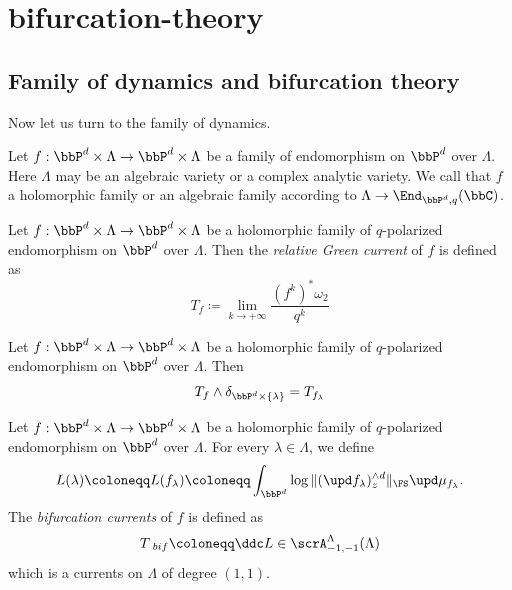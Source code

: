 \section{bifurcation-theory}

\subsection[status=draft,tag=0000000,label=\labelNFM{subsec:family-of-dynamics-and-bifurcation-theorey}]{Family of dynamics and bifurcation theory}

Now let us turn to the family of dynamics.

Let $f: \bbP^d \times \Lambda \to \bbP^d \times \Lambda$ be a family of endomorphism on $\bbP^d$ over $\Lambda$.
Here $\Lambda$ may be an algebraic variety or a complex analytic variety.
We call that $f$ a holomorphic family or an algebraic family according to $\Lambda \to \End_{\bbP^d,q}(\bbC)$.

\begin{definition}[label=\labelNFM{def:relative-green-currents}, status=draft, tag=0000000]
	Let $f: \bbP^d \times \Lambda \to \bbP^d \times \Lambda$ be a holomorphic family of $q$-polarized endomorphism on $\bbP^d$ over $\Lambda$.
	Then the \emph{relative Green current} of $f$ is defined as
	\[ T_f \coloneqq \lim_{k \to +\infty} \frac{(f^k)^*\omega_2}{q^k} \]

	\Yang{}
\end{definition}

\begin{lemma}[label=\labelNFM{lem:relative-green-currents-and-green-currents}, status=draft, tag=0000000]
	Let $f: \bbP^d \times \Lambda \to \bbP^d \times \Lambda$ be a holomorphic family of $q$-polarized endomorphism on $\bbP^d$ over $\Lambda$.
	Then
	\[ T_f \wedge \delta_{\bbP^d \times \{\lambda\}} = T_{f_\lambda} \]
	\Yang{}
\end{lemma}

\begin{definition}[label=\labelNFM{def:bifurcation-currents}, status=draft, tag=0000000]
	Let $f: \bbP^d \times \Lambda \to \bbP^d \times \Lambda$ be a holomorphic family of $q$-polarized endomorphism on $\bbP^d$ over $\Lambda$.
	For every $\lambda \in \Lambda$, we define
	\[ L(\lambda) \coloneqq L(f_\lambda) \coloneqq \int_{\bbP^d} \log \|(\upd f_\lambda)_z^{\wedge d}\|_{\FS} \upd \mu_{f_\lambda}. \]
	The \emph{bifurcation currents} of $f$ is defined as
	\[ T_{\ bif} \coloneqq \ddc L \in \scrA^\Lambda_{-1,-1}(\Lambda) \]
	which is a currents on $\Lambda$ of degree $(1,1)$.
	\Yang{}
\end{definition}

